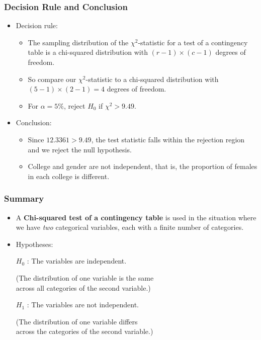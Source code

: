 \documentclass[12pt]{beamer}
\begin{document}
\begin{frame}
	\frametitle{Decision Rule and Conclusion}
	
	\begin{itemize}[label={\color{blue}$\blacktriangleright$}]
		\item Decision rule:
		\begin{itemize}[label={\color{blue}$\blacktriangleright$}]
			\item The sampling distribution of the $\chi^2$-statistic for a test of a contingency table is a chi-squared distribution with $(r-1) \times (c-1)$ degrees of freedom.
			\item So compare our $\chi^2$-statistic to a chi-squared distribution with $(5-1) \times (2-1) = 4$ degrees of freedom.
			\item For $\alpha = 5\%$, reject $H_0$ if $\chi^2 > 9.49$.
		\end{itemize}
		
		\item Conclusion:
		\begin{itemize}[label={\color{blue}$\blacktriangleright$}]
			\item Since $12.3361 > 9.49$, the test statistic falls within the rejection region and we reject the null hypothesis.
			\item College and gender are not independent, that is, the proportion of females in each college is different.
		\end{itemize}
	\end{itemize}
	
\end{frame}
\begin{frame}
	\frametitle{Summary}
	
	\begin{itemize}[label={\color{blue}$\blacktriangleright$}]
		\item A \textbf{Chi-squared test of a contingency table} is used in the situation where we have \emph{two} categorical variables, each with a finite number of categories.
		
		\item Hypotheses:
		
		\medskip
		$H_0$ : The variables are independent.
		
		\hspace*{2em}(The distribution of one variable is the same\\ 
		\hspace*{2em}across all categories of the second variable.)
		
		\medskip
		$H_1$ : The variables are not independent.
		
		\hspace*{2em}(The distribution of one variable differs\\
		\hspace*{2em}across the categories of the second variable.)
	\end{itemize}
	
\end{frame}
\end{document}
